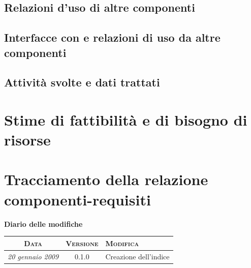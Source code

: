 \documentclass[11pt,a4paper]{article}
\newcommand{\modifiche} 
{
\newpage
\begin{center}
\textbf{Diario delle modifiche} \\
\bigskip
\begin{tabular}{|c|c|p{0.51\textwidth}|}
\hline
\textsc{Data} & \textsc{Versione} & \textsc{Modifica} \\
\hline
\hline
\textit{20 gennaio 2009} & 0.1.0 & Creazione dell'indice \\
\hline
\end{tabular}
\end{center}
}
\begin{document}
\subsection{Relazioni d'uso di altre componenti}
\subsection{Interfacce con e relazioni di uso da altre componenti}
\subsection{Attività svolte e dati trattati}
\section{Stime di fattibilità e di bisogno di risorse}
\section{Tracciamento della relazione componenti-requisiti}
\modifiche
\end{document}
